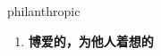 
\begin{frame}
{\huge philanthropic}
\begin{center}
\begin{enumerate}\Large
  \item \textbf{博爱的，为他人着想的}
\end{enumerate}
\end{center}
\end{frame}
